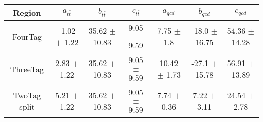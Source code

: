 \begin{footnotesize} 
\begin{tabular}{c|c|c|c|c|c|c} 
Region & $ a_{t\bar{t}}$ & $ b_{t\bar{t}}$ & $ c_{t\bar{t}}$ & $ a_{qcd}$ & $ b_{qcd}$ & $c_{qcd}$ \\ 
\hline\hline 
FourTag & -1.02 $\pm$ 1.22 & 35.62 $\pm$ 10.83 & 9.05 $\pm$ 9.59 & 7.75 $\pm$ 1.8 & -18.0 $\pm$ 16.75 & 54.36 $\pm$ 14.28\\ 
ThreeTag & 2.83 $\pm$ 1.22 & 35.62 $\pm$ 10.83 & 9.05 $\pm$ 9.59 & 10.42 $\pm$ 1.73 & -27.1 $\pm$ 15.78 & 56.91 $\pm$ 13.89\\ 
TwoTag split & 5.21 $\pm$ 1.22 & 35.62 $\pm$ 10.83 & 9.05 $\pm$ 9.59 & 7.74 $\pm$ 0.36 & 7.22 $\pm$ 3.11 & 24.54 $\pm$ 2.78\\ 
\hline\hline 
\end{tabular} 
\end{footnotesize} 
\newline 
